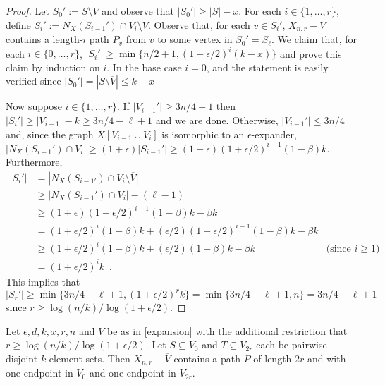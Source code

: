 \documentclass{patmorin}
\begin{document}
\begin{proof}
  Let $S_0':= S\setminus\overline{V}$ and observe that $|S_0'|\ge |S|-x$.  For each $i\in\{1,\ldots,r\}$, define
  $S_i':=N_X(S_{i-1}')\cap V_i\setminus \overline{V}$.
  Observe that, for each $v\in S_i'$, $X_{n,r}-\overline{V}$ contains a length-$i$ path $P_v$ from $v$ to some vertex in $S_0'=S_{\ell}$.  We claim that, for each $i\in\{0,\ldots,r\}$,
  $|S_i'|\ge \min\{n/2+1,(1+\epsilon/2)^i(k-x)\}$
  and prove this claim by induction on $i$.  In the base case $i=0$, and the statement is easily verified since $|S_0'|=|S\setminus\overline{V}|\le k-x$


  Now suppose $i\in\{1,\ldots,r\}$.  If $|V_{i-1}'|\ge 3n/4+1$ then $|S_i'|\ge |V_{i-1}|-k\ge 3n/4-\ell+1$ and we are done.  Otherwise, $|V_{i-1}'|\le 3n/4$ and, since the graph $X[V_{i-1}\cup V_i]$ is isomorphic to an $\epsilon$-expander,  $|N_X(S_{i-1}')\cap V_i| \ge (1+\epsilon)|S_{i-1}'|\ge (1+\epsilon)(1+\epsilon/2)^{i-1}(1-\beta)k$.  Furthermore,
  \begin{align*}
    |S_i'| & = |N_X(S_{i-1'})\cap V_i\setminus \overline{V}| \\
      & \ge |N_X(S_{i-1}')\cap V_i|-(\ell-1) \\
      & \ge (1+\epsilon)(1+\epsilon/2)^{i-1}(1-\beta)k-\beta k \\
      & = (1+\epsilon/2)^i(1-\beta)k + (\epsilon/2)(1+\epsilon/2)^{i-1}(1-\beta) k - \beta k \\
      & \ge (1+\epsilon/2)^i(1-\beta)k + (\epsilon/2)(1-\beta) k - \beta k
       & \text{(since $i\ge 1$)} \\
      & = (1+\epsilon/2)^ik \enspace .
  \end{align*}
  This implies that
  \[
    |S_r'|\ge \min\{3n/4-\ell+1,(1+\epsilon/2)^rk\} = \min\{3n/4-\ell+1,n\} = 3n/4-\ell+1
  \]
  since $r\ge \log(n/k)/\log(1+\epsilon/2)$.
\end{proof}

\begin{lem}\label{one_path}
  Let $\epsilon, d, k, x, r, n$ and $\overline{V}$ be as in \cref{expansion} with the additional restriction that $r\ge\log(n/k)/\log(1+\epsilon/2)$. Let $S\subseteq V_0$ and $T\subseteq V_{2r}$ each be pairwise-disjoint $k$-element sets.  Then $X_{n,r}-\overline{V}$ contains a path $P$ of length $2r$ and with one endpoint in $V_0$ and one endpoint in $V_{2r}$.
\end{lem}
\end{document}
